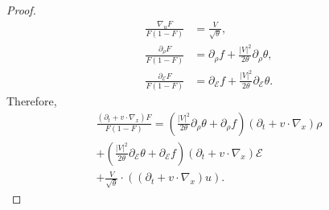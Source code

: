 \begin{proof}
 
\begin{equation*}\label{eq:choicePartial}
\begin{aligned}
 \frac{\nabla_u F}{F(1-F)} &= \frac{V}{\sqrt\theta},\\
\frac{\partial_{\rho} F}{F(1-F)}&= \partial_\rho
f+\frac{|V|^2}{2\theta}\partial_\rho\theta,\\
\frac{\partial_{\mathcal E}
F}{F(1-F)}&= \partial_{\mathcal E}f+\frac{|V|^2}{2\theta}\partial_{\mathcal
E}\theta.
\end{aligned}
\end{equation*}
Therefore, 
\begin{equation}
 \label{eq:choiceTotal1st}\begin{split}
 \frac{(\partial_t   + v\cdot \nabla_x)F}{F(1-F)} = 
\left(
\frac{|V|^2}{2\theta}\partial_\rho\theta+\partial_\rho f\right) (\partial_t +
v\cdot \nabla_x)\rho \\
+\left(\frac{|V|^2}{2\theta}\partial_{\mathcal
E}\theta+\partial_{\mathcal E}f\right) (\partial_t  + v\cdot
\nabla_x)\mathcal
E \\ 
+ \frac{V}{\sqrt\theta}\cdot ((\partial_t   + v\cdot \nabla_x)u).\end{split}
\end{equation}


\end{proof}
